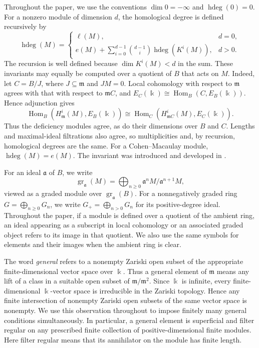 \documentclass[11pt,reqno]{amsart}
\numberwithin{equation}{section}
\theoremstyle{definition}
\newcommand{\m}{\mathfrak m}
\newcommand{\hdeg}{\operatorname{hdeg}}
\begin{document}
Throughout the paper, we use the conventions $\dim 0=-\infty$ and $\hdeg(0)=0$.  For a
nonzero module of dimension $d$, the homological degree is defined
recursively by
\begin{equation}
 \hdeg(M)=
 \begin{cases}
  \ell(M),&d=0,\\[2mm]
  e(M)+\displaystyle\sum_{i=0}^{d-1}
          \binom{d-1}{i}\hdeg(K^i(M)),&d>0.
 \end{cases}
 \label{eq:module-hdeg-definition}
\end{equation}
The recursion is well defined because $\dim K^i(M)<d$ in the sum.
These invariants may equally be computed over a quotient of $B$
that acts on $M$. Indeed, let $C=B/J$, where $J\subseteq\m$ and $JM=0$. Local cohomology
with respect to $\m$ agrees with that with respect to $\m C$, and
$E_C(\Bbbk)\cong\operatorname{Hom}_B(C,E_B(\Bbbk))$.
Hence adjunction gives
\[
 \operatorname{Hom}_B(H^i_{\m}(M),E_B(\Bbbk))
 \cong
 \operatorname{Hom}_C(H^i_{\m C}(M),E_C(\Bbbk)).
\]
Thus the deficiency modules agree, as do their dimensions over $B$
and $C$. Lengths and maximal-ideal filtrations also agree, so
multiplicities and, by recursion, homological degrees are the same.
For a Cohen--Macaulay module, $\hdeg(M)=e(M)$.  The invariant was
introduced and developed in \cite[Definition~2.8 and Section~3]{Vasconcelos1998}.

For an ideal $\mathfrak a$ of $B$, we write
\[
 \operatorname{gr}_{\mathfrak a}(M)
 =\bigoplus_{n\ge0}\mathfrak a^nM/\mathfrak a^{n+1}M,
\]
viewed as a graded module over $\operatorname{gr}_{\mathfrak a}(B)$.
For a nonnegatively graded ring $G=\bigoplus_{n\ge0}G_n$, we write
$G_+=\bigoplus_{n>0}G_n$ for its positive-degree ideal.
Throughout the paper, if a module is defined over a quotient of the
ambient ring, an ideal appearing as a subscript in local cohomology or
an associated graded object refers to its image in that quotient.
We also use the same symbols for elements and their images when the
ambient ring is clear.

The word \emph{general} refers to a nonempty Zariski open subset of the
appropriate finite-dimensional vector space over $\Bbbk$.  Thus a
general element of $\m$ means any lift of a class in a suitable open
subset of $\m/\m^2$.
Since $\Bbbk$ is infinite, every finite-dimensional $\Bbbk$-vector
space is irreducible in the Zariski topology. Hence any finite
intersection of nonempty Zariski open subsets of the same vector
space is nonempty. We use this observation throughout to impose
finitely many general conditions simultaneously. In particular, a
general element is superficial and filter regular on any prescribed
finite collection of positive-dimensional finite modules.  Here
filter regular means that its annihilator on the module has finite
length.
\end{document}
